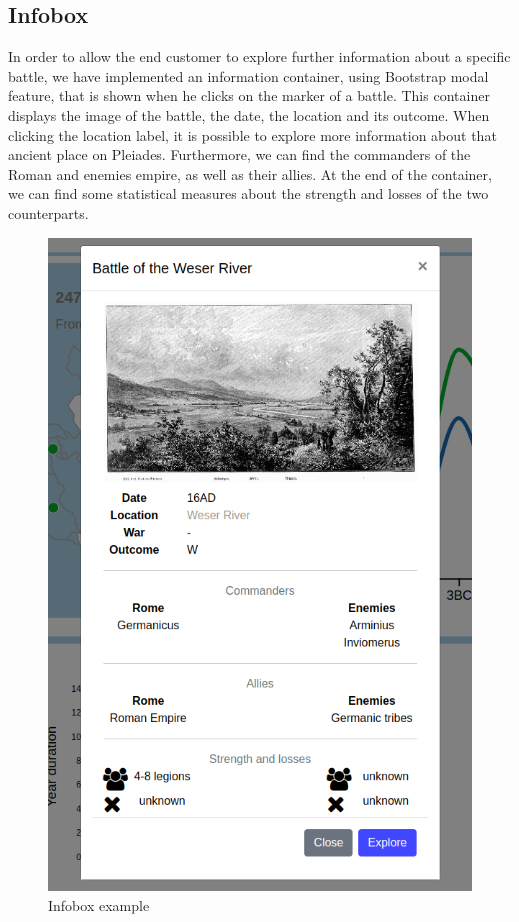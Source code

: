 \subsection{Infobox}
In order to allow the end customer to explore further information about a specific battle, we have implemented an information container, using Bootstrap modal feature, that is shown when he clicks on the marker of a battle.
This container displays the image of the battle, the date, the location and its outcome.
When clicking the location label, it is possible to explore more information about that ancient place on Pleiades.
Furthermore, we can find the commanders of the Roman and enemies empire, as well as their allies.
At the end of the container, we can find some statistical measures about the strength and losses of the two counterparts.
\begin{figure}[h]
    \centering
    \includegraphics[scale=0.20]{./images/infobox.png}
    \caption{Infobox example}
\end{figure}

